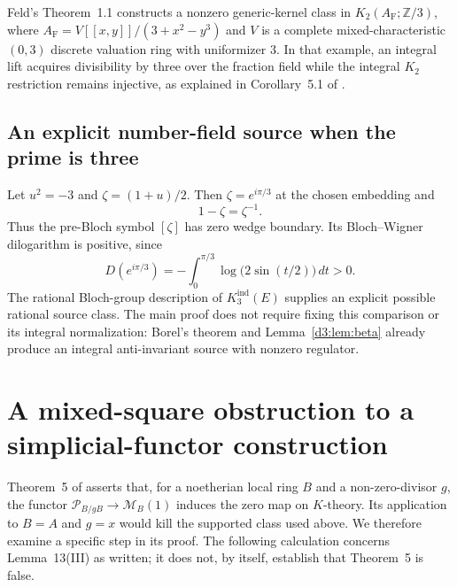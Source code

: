 \documentclass[11pt,a4paper]{amsart}
\numberwithin{equation}{section}
\theoremstyle{definition}
\theoremstyle{remark}
\begin{document}
Feld's Theorem~1.1 \cite{FeldFiniteGersten2026} constructs a nonzero
generic-kernel class in $K_2(A_{\mathrm F};\mathbb{Z}/3)$, where
$A_{\mathrm F}=V[[x,y]]/(3+x^2-y^3)$ and $V$ is a complete mixed-characteristic
$(0,3)$ discrete valuation ring with uniformizer $3$.
In that example, an integral lift acquires divisibility by three over
the fraction field while the integral $K_2$ restriction remains injective,
as explained in Corollary~5.1 of \cite{FeldFiniteGersten2026}.

\subsection{An explicit number-field source when the prime is three}
Let $u^2=-3$ and $\zeta=(1+u)/2$. Then $\zeta=e^{i\pi/3}$ at the chosen embedding and
\[
1-\zeta=\zeta^{-1}.
\]
Thus the pre-Bloch symbol $[\zeta]$ has zero wedge boundary. Its Bloch--Wigner dilogarithm is positive, since
\[
D(e^{i\pi/3})=-\int_0^{\pi/3}\log\bigl(2\sin(t/2)\bigr)\,dt>0.
\]
The rational Bloch-group description of $K_3^{\mathrm{ind}}(E)$ \cite[VI, Theorem~5.2]{Weibel} supplies an explicit possible rational source class. The main proof does not require fixing this comparison or its integral normalization: Borel's theorem and Lemma~\ref{d3:lem:beta} already produce an integral anti-invariant source with nonzero regulator.

\section{A mixed-square obstruction to a simplicial-functor construction}
\label{d3:sec:mochizukisquare}

Theorem~5 of \cite{MochizukiParameters} asserts that, for a noetherian
local ring $B$ and a non-zero-divisor $g$, the functor
$\mathcal P_{B/gB}\to\mathcal M_B(1)$ induces the zero map on
$K$-theory. Its application to $B=A$ and $g=x$ would kill the supported
class used above. We therefore examine a specific step in its proof.
The following calculation concerns Lemma~13(III) as written; it does
not, by itself, establish that Theorem~5 is false.
\end{document}
